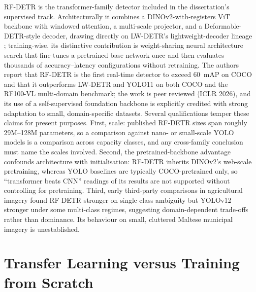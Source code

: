 RF-DETR \citep{robinson2025rfdetr} is the transformer-family detector included in the dissertation's supervised track. Architecturally it combines a DINOv2-with-registers ViT backbone with windowed attention, a multi-scale projector, and a Deformable-DETR-style decoder, drawing directly on LW-DETR's lightweight-decoder lineage \citep{chen2024lwdetr,zhu2021deformable,oquab2024dinov2}; training-wise, its distinctive contribution is weight-sharing neural architecture search that fine-tunes a pretrained base network once and then evaluates thousands of accuracy--latency configurations without retraining. The authors report that RF-DETR is the first real-time detector to exceed 60~mAP on COCO and that it outperforms LW-DETR and YOLO11 on both COCO and the RF100-VL multi-domain benchmark; the work is peer reviewed (ICLR 2026), and its use of a self-supervised foundation backbone is explicitly credited with strong adaptation to small, domain-specific datasets. Several qualifications temper these claims for present purposes. First, scale: published RF-DETR sizes span roughly 29M--128M parameters, so a comparison against nano- or small-scale YOLO models is a comparison across capacity classes, and any cross-family conclusion must name the scales involved. Second, the pretrained-backbone advantage confounds architecture with initialisation: RF-DETR inherits DINOv2's web-scale pretraining, whereas YOLO baselines are typically COCO-pretrained only, so ``transformer beats CNN'' readings of its results are not supported without controlling for pretraining. Third, early third-party comparisons in agricultural imagery found RF-DETR stronger on single-class ambiguity but YOLOv12 stronger under some multi-class regimes, suggesting domain-dependent trade-offs rather than dominance. Its behaviour on small, cluttered Maltese municipal imagery is unestablished.

\section{Transfer Learning versus Training from Scratch}
\label{sec:lr-transfer}

